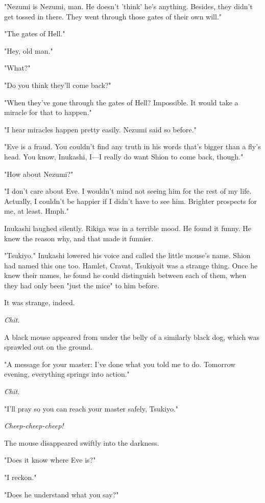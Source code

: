 "Nezumi is Nezumi, man. He doesn't 'think' he's anything. Besides, they
didn't get tossed in there. They went through those gates of their own
will."

"The gates of Hell."

"Hey, old man."

"What?"

"Do you think they'll come back?"

"When they've gone through the gates of Hell? Impossible. It would take
a miracle for that to happen."

"I hear miracles happen pretty easily. Nezumi said so before."

"Eve is a fraud. You couldn't find any truth in his words that's bigger
than a fly's head. You know, Inukashi, I---I really do want Shion to come
back, though."

"How about Nezumi?"

"I don't care about Eve. I wouldn't mind not seeing him for the rest of
my life. Actually, I couldn't be happier if I didn't have to see him.
Brighter prospects for me, at least. Hmph."

Inukashi laughed silently. Rikiga was in a terrible mood. He found it
funny. He knew the reason why, and that made it funnier.

"Tsukiyo." Inukashi lowered his voice and called the little mouse's
name. Shion had named this one too. Hamlet, Cravat, Tsukiyo\el it was a
strange thing. Once he knew their names, he found he could distinguish
between each of them, when they had only been "just the mice" to him
before.

It was strange, indeed.

\emph{Chit.}

A black mouse appeared from under the belly of a similarly black dog,
which was sprawled out on the ground.

"A message for your master: I've done what you told me to do. Tomorrow
evening, everything springs into action."

\emph{Chit.}

"I'll pray so you can reach your master safely, Tsukiyo."

\emph{Cheep-cheep-cheep!}

The mouse disappeared swiftly into the darkness.

"Does it know where Eve is?"

"I reckon."

"Does he understand what you say?"

